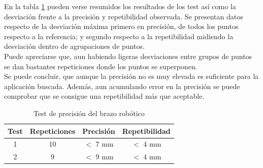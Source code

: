 	En la tabla \ref{tab:resultados_precision} pueden verse resumidos los resultados de los test así como la desviación frente a la precisión y repetibilidad observada. Se presentan datos respecto de la desviación máxima primero en precisión, de todos los puntos respecto a la referencia; y segundo respecto a la repetibilidad midiendo la desviación dentro de agrupaciones de puntos.
	\\
	
	Puede apreciarse que, aun habiendo ligeras desviaciones entre grupos de puntos se dan bastantes repeticiones donde los puntos se superponen. 
	\\
	
	Se puede concluir, que aunque la precisión no es muy elevada es suficiente para la aplicación buscada. Además, aun acumulando error en la precisión se puede comprobar que se consigue una repetibilidad más que aceptable.
	
	\begin{table}[htbp]
		\centering
		\caption{Test de precisión del brazo robótico}
		\label{tab:resultados_precision}
		\begin{center}
			\begin{tabular}{|c|c|c|c|}
				\hline
				\textbf{Test} & \textbf{Repeticiones} & \textbf{Precisión} & \textbf{Repetibilidad} \\
				\hline
				1 & 10 & $<$ 7 mm & $<$ 4 mm \\
				\hline
				2 & 9 & $<$ 9 mm  & $<$ 4 mm \\
				\hline
			\end{tabular}
		\end{center}
	\end{table}

